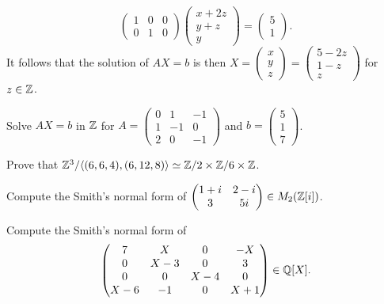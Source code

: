 \begin{example}
\[\begin{pmatrix}
		1 & 0 & 0\\
		0 & 1 & 0
	\end{pmatrix}\begin{pmatrix}
		x+2z\\
		y+z\\
		y
	\end{pmatrix}
	=\begin{pmatrix}
		5\\
		1
	\end{pmatrix}.
	\]
	It follows that the solution of $AX=b$ is then $X=\begin{pmatrix}
		x\\
		y\\
		z
	\end{pmatrix}
	=\begin{pmatrix}
		5-2z\\
		1-z\\
		z
	\end{pmatrix}$ for $z\in\mathbb{Z}$. 
\end{example}

\begin{exercise}
	\label{xca:AX=b}
	Solve $AX=b$ in $\mathbb{Z}$ for $A=\begin{pmatrix}
		0 & 1 & -1\\
		1 & -1 & 0\\
		2 & 0 & -1
	\end{pmatrix}$ and $b=\begin{pmatrix}
		5\\
		1\\
		7
	\end{pmatrix}$. 
\end{exercise}

\begin{exercise}
	\label{xca:factors_260}
	Prove that $\mathbb{Z}^3/\langle
	(6,6,4),(6,12,8)\rangle\simeq\mathbb{Z}/2\times\mathbb{Z}/6\times\mathbb{Z}$.
\end{exercise}

\begin{exercise}
	\label{xca:Smith_Z[i]}
	Compute the Smith's normal 
	form of 
	$\begin{pmatrix}
		1+i & 2-i\\
		3 & 5i
	\end{pmatrix}\in M_2(\mathbb{Z}[i])$. 
\end{exercise}

\begin{exercise}
	\label{xca:Smith_Q[X]}
	Compute the Smith's normal form of
	\[
		\begin{pmatrix}
			7 & X & 0 & -X \\
			0 & X-3 & 0 & 3\\
			0 & 0 & X-4 & 0 \\
			X-6 & -1 & 0 & X+1 
		\end{pmatrix}\in\mathbb{Q}[X].
	\]
\end{exercise}
